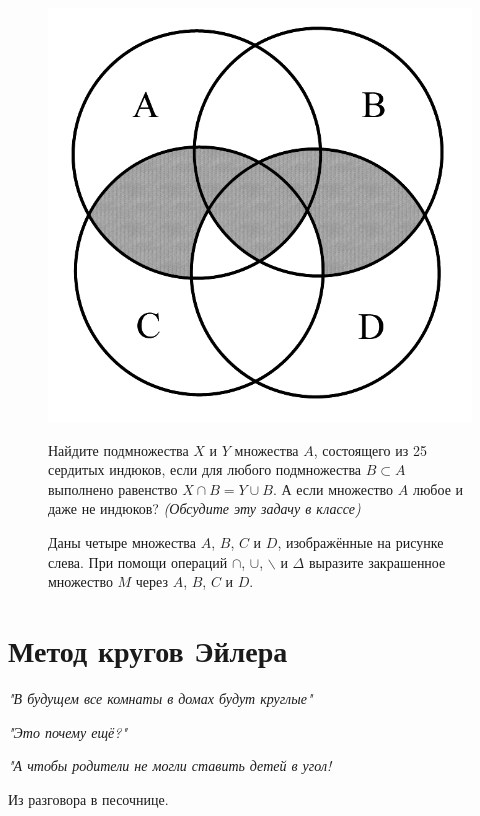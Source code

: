 {\setlength{\intextsep}{2pt}
\begin{figure}[H]
\begin{minipage}{0.19\linewidth}
    \includegraphics[width=0.9\columnwidth]{./img/euler2}
\end{minipage}
\hfill
\begin{minipage}{0.8\linewidth}\setlength{\parindent}{1.5em}
\begin{thm}
Найдите подмножества $X$ и $Y$ множества $A$, состоящего из 25 сердитых индюков, если для любого подмножества $B \subset A$ выполнено равенство $X \cap B = Y \cup B$. А если множество $A$ любое и даже не индюков? \textit{(Обсудите эту задачу в классе)}
\end{thm}

    \begin{thm}
    Даны четыре множества $A$, $B$, $C$ и $D$, изображённые на рисунке слева. При помощи операций $\cap$, $\cup$, $ \backslash $ и $\Delta$ выразите закрашенное множество $M$ через $A$, $B$, $C$ и $D$.
    \end{thm}
\end{minipage}
\end{figure}}

\section{Метод кругов Эйлера}
\epigraph{
\textit{"В будущем все комнаты в домах будут круглые"}
\par
\textit{"Это почему ещё?"}
\par
\textit{"А чтобы родители не могли ставить детей в угол!}}{Из разговора в песочнице.}

